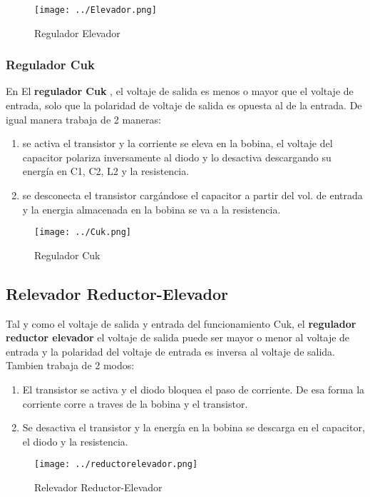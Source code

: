 \documentclass[11pt,a4paper]{article}
\begin{document}
\begin{figure}[h]
\centering
\texttt{[image: ../Elevador.png]} 
\caption{Regulador Elevador} 
\end{figure}

\subsubsection{Regulador Cuk}
En El \textbf{regulador Cuk} , el voltaje de salida es menos o mayor que el voltaje de entrada, solo que la polaridad de voltaje de salida es opuesta al de la entrada. De igual manera trabaja de 2 maneras:\begin{enumerate}
\item se activa el transistor y la corriente se eleva en la bobina, el voltaje del capacitor polariza inversamente al diodo y lo desactiva descargando su energía en C1,  C2, L2 y la resistencia.
\item se desconecta el transistor cargándose el capacitor a partir del vol. de entrada y la energia almacenada en la bobina se va a la resistencia. 
\end{enumerate}

\begin{figure}[h]
\centering
\texttt{[image: ../Cuk.png]} 
\caption{Regulador Cuk} 
\end{figure}

\subsection{Relevador Reductor-Elevador}
Tal y como el voltaje de salida y entrada del funcionamiento Cuk, el \textbf{regulador reductor elevador} el voltaje de salida puede ser mayor o menor al voltaje de entrada y la polaridad del voltaje de entrada es inversa al voltaje de salida. Tambien trabaja de 2 modos:\begin{enumerate}
\item El transistor se activa y el diodo bloquea el paso de corriente.  De esa forma la corriente corre a traves de la bobina y el transistor.
\item Se desactiva el transistor y la energía en la bobina se descarga en el capacitor, el diodo y la resistencia. 
\end{enumerate}

\begin{figure}[h]
\centering
\texttt{[image: ../reductorelevador.png]} 
\caption{Relevador Reductor-Elevador} 
\end{figure}
\end{document}
